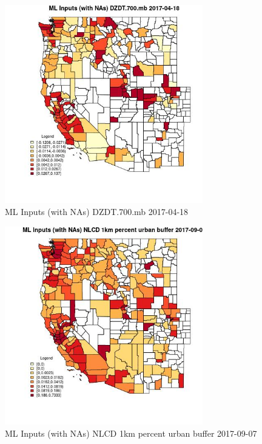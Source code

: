 \begin{figure} 
\centering  
\includegraphics[width=0.77\textwidth]{Code_Outputs/Report_ML_input_PM25_Step4_part_e_de_duplicated_aves_compiled_2019-05-21wNAs_CountyDZDT700mbMean2017-04-18.jpg} 
\caption{\label{fig:Report_ML_input_PM25_Step4_part_e_de_duplicated_aves_compiled_2019-05-21wNAsCountyDZDT700mbMean2017-04-18}ML Inputs (with NAs) DZDT.700.mb 2017-04-18} 
\end{figure} 
 

\begin{figure} 
\centering  
\includegraphics[width=0.77\textwidth]{Code_Outputs/Report_ML_input_PM25_Step4_part_e_de_duplicated_aves_compiled_2019-05-21wNAs_CountyNLCD_1km_percent_urban_bufferMean2017-09-07.jpg} 
\caption{\label{fig:Report_ML_input_PM25_Step4_part_e_de_duplicated_aves_compiled_2019-05-21wNAsCountyNLCD_1km_percent_urban_bufferMean2017-09-07}ML Inputs (with NAs) NLCD 1km percent urban buffer 2017-09-07} 
\end{figure} 
 

